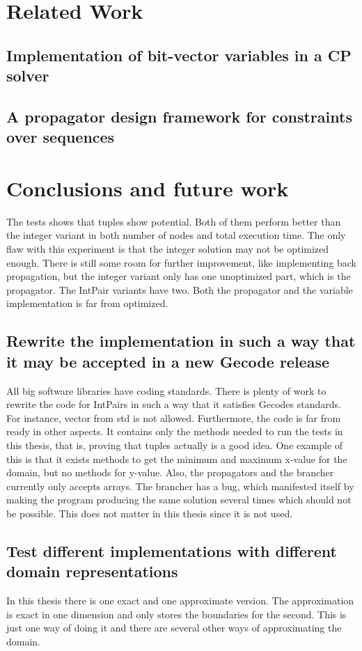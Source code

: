 \documentclass[a4paper,11pt]{article}
\begin{document}
\section{Related Work}
\subsection{Implementation of bit-vector variables in a CP solver}
\subsection{A propagator design framework for constraints over sequences}

\section{Conclusions and future work}
The tests shows that tuples show potential. Both of them perform better than the integer variant in both number of nodes and total execution time. The only flaw with this experiment is that the integer solution may not be optimized enough. There is still some room for further improvement, like implementing back propagation, but the integer variant only has one unoptimized part, which is the propagator. The IntPair variants have two. Both the propagator and the variable implementation is far from optimized. 

\subsection{Rewrite the implementation in such a way that it may be accepted in a new Gecode release}
All big software libraries have coding standards. There is plenty of work to rewrite the code for IntPairs in such a way that it satisfies Gecodes standards. For instance, vector from std is not allowed. Furthermore, the code is far from ready in other aspects. It contains only the methods needed to run the tests in this thesis, that is, proving that tuples actually is a good idea. One example of this is that it exists methods to get the minimum and maximum x-value for the domain, but no methods for y-value. Also, the propagators and the brancher currently only accepts arrays. The brancher has a bug, which manifested itself by making the program producing the same solution several times which should not be possible. This does not matter in this thesis since it is not used.

\subsection{Test different implementations with different domain representations}
In this thesis there is one exact and one approximate version. The approximation is exact in one dimension and only stores the boundaries for the second. This is just one way of doing it and there are several other ways of approximating the domain.
\end{document}
